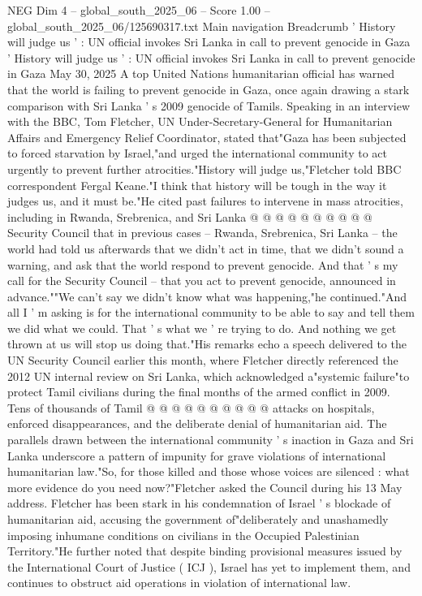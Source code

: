 \begin{textsample}{NEG Dim 4 – global\_south\_2025\_06 – Score 1.00 – global\_south\_2025\_06/125690317.txt}  \label{ex:f4_neg_103}
Main navigation Breadcrumb ' History will judge us ' : UN official invokes Sri Lanka in call to prevent genocide in Gaza ' History will judge us ' : UN official invokes Sri Lanka in call to prevent genocide in Gaza May 30, 2025 A top United Nations humanitarian official has warned that the world is failing to prevent genocide in Gaza, once again drawing a stark comparison with Sri Lanka ' s 2009 genocide of Tamils.
Speaking in an interview with the BBC, Tom Fletcher, UN Under-Secretary-General for Humanitarian Affairs and Emergency Relief Coordinator, stated that"Gaza has been subjected to forced starvation by Israel,"and urged the international community to act urgently to prevent further atrocities."History will judge us,"Fletcher told BBC correspondent Fergal Keane."I think that history will be tough in the way it judges us, and it must be."He cited past failures to intervene in mass atrocities, including in Rwanda, Srebrenica, and Sri Lanka @ @ @ @ @ @ @ @ @ @ Security Council that in previous cases -- Rwanda, Srebrenica, Sri Lanka -- the world had told us afterwards that we didn't act in time, that we didn't sound a warning, and ask that the world respond to prevent genocide.
And that ' s my call for the Security Council -- that you act to prevent genocide, announced in advance.""We can't say we didn't know what was happening,"he continued."And all I ' m asking is for the international community to be able to say and tell them we did what we could.
That ' s what we ' re trying to do.
And nothing we get thrown at us will stop us doing that."His remarks echo a speech delivered to the UN Security Council earlier this month, where Fletcher directly referenced the 2012 UN internal review on Sri Lanka, which acknowledged a"systemic failure"to protect Tamil civilians during the final months of the armed conflict in 2009.
Tens of thousands of Tamil @ @ @ @ @ @ @ @ @ @ attacks on hospitals, enforced disappearances, and the deliberate denial of humanitarian aid.
The parallels drawn between the international community ' s inaction in Gaza and Sri Lanka underscore a pattern of impunity for grave violations of international humanitarian law."So, for those killed and those whose voices are silenced : what more evidence do you need now?"Fletcher asked the Council during his 13 May address.
Fletcher has been stark in his condemnation of Israel ' s blockade of humanitarian aid, accusing the government of"deliberately and unashamedly imposing inhumane conditions on civilians in the Occupied Palestinian Territory."He further noted that despite binding provisional measures issued by the International Court of Justice ( ICJ ), Israel has yet to implement them, and continues to obstruct aid operations in violation of international law.

\end{textsample}
